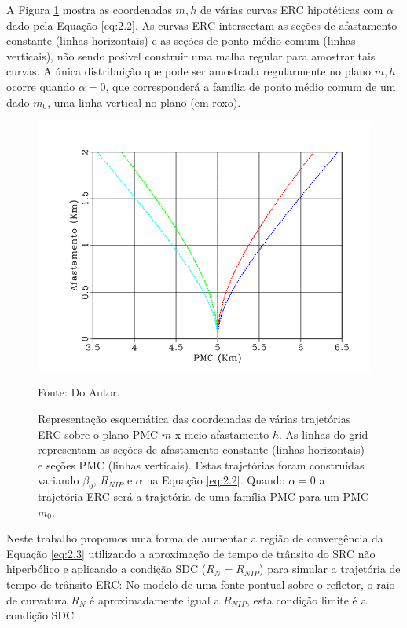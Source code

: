 A Figura \ref{fig:2.2} mostra as coordenadas $m,h$ de várias curvas ERC hipotéticas com $\alpha$ dado pela Equação \ref{eq:2.2}.
As curvas ERC intersectam as seções de afastamento constante (linhas horizontais) e as seções de ponto médio comum 
(linhas verticais), não sendo posível construir uma malha regular para amostrar tais curvas.
A única distribuição que pode ser amostrada regularmente no plano $m,h$ ocorre quando $\alpha=0$, que corresponderá
a família de ponto médio comum de um dado $m_0$, uma linha vertical no plano (em roxo).

\begin{figure}[htb]
\caption{Representação esquemática das coordenadas de várias trajetórias ERC sobre o plano PMC $m$ x meio afastamento
$h$. As linhas do grid representam as seções de afastamento constante (linhas horizontais) e seções PMC (linhas verticais).
Estas trajetórias foram construídas variando $\beta_0$, $R_{NIP}$ e $\alpha$  na Equação \ref{eq:2.2}. Quando
$\alpha=0$ a trajetória ERC será a trajetória de uma família PMC para um PMC $m_0$.}
\begin{center}
\includegraphics[scale=0.5]{images/creCoord.png}
\vspace{-0.3cm}
\end{center}
\begin{center}
 Fonte: Do Autor.
\end{center}
\label{fig:2.2}
\end{figure}

Neste trabalho propomos uma forma de aumentar a região de convergência da Equação \ref{eq:2.3} utilizando a
aproximação de tempo de trânsito do SRC não hiperbólico e aplicando a condição SDC ($R_N=R_{NIP}$) para
simular a trajetória de tempo de trânsito ERC: No modelo de uma fonte pontual sobre o refletor, o raio de 
curvatura $R_N$ é aproximadamente igual a $R_{NIP}$, esta condição limite é a condição SDC \cite{shav}.

